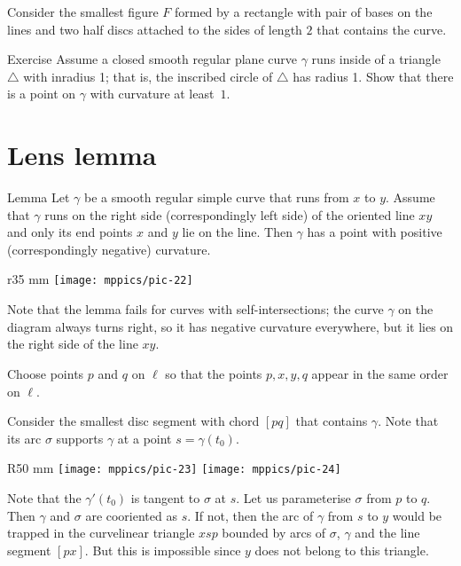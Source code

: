  Consider the smallest figure $F$ formed by a rectangle with pair of bases on the lines and two half discs attached to the sides of length $2$ that contains the curve.   

\begin{thm}{Exercise}
Assume a closed smooth regular plane curve $\gamma$ runs inside of a triangle $\triangle$ with inradius 1; that is, the inscribed circle of $\triangle$ has radius 1.
Show that there is a point on $\gamma$ with curvature at least~$1$.
\end{thm}

\section*{Lens lemma}

\begin{thm}{Lemma}\label{lem:lens}
Let $\gamma$ be a smooth regular simple curve that runs from $x$ to $y$.
Assume that $\gamma$ runs on the right side (correspondingly left side) of the oriented line $xy$ and only its end points $x$ and $y$ lie on the line.
Then $\gamma$ has a point with positive  (correspondingly negative) curvature.
\end{thm}

\begin{wrapfigure}{r}{35 mm}
\vskip-4mm
\centering
\texttt{[image: mppics/pic-22]}
\vskip0mm
\end{wrapfigure}

Note that the lemma fails for curves with self-intersections;
the curve $\gamma$ on the diagram always turns right, 
so it has negative curvature everywhere, but it lies on the right side of the line $xy$.

Choose points $p$ and $q$ on $\ell$
so that the points $p, x, y, q$ appear in the same order on $\ell$.

Consider the smallest disc segment with chord $[pq]$ that contains $\gamma$.
Note that its arc $\sigma$ supports $\gamma$ at a point $s=\gamma(t_0)$.

\begin{wrapfigure}{R}{50 mm}
\centering
\texttt{[image: mppics/pic-23]}
\bigskip
\texttt{[image: mppics/pic-24]}
\vskip0mm
\end{wrapfigure}

Note that the $\gamma'(t_0)$ is tangent to $\sigma$ at $s$.
Let us parameterise $\sigma$ from $p$ to $q$.
Then $\gamma$ and $\sigma$ are cooriented as $s$.
If not, then the arc of $\gamma$ from $s$ to $y$ would be trapped in the curvelinear triangle $xsp$ bounded by arcs of $\sigma$, $\gamma$ and the line segment $[px]$.
But this is impossible since $y$ does not belong to this triangle.



